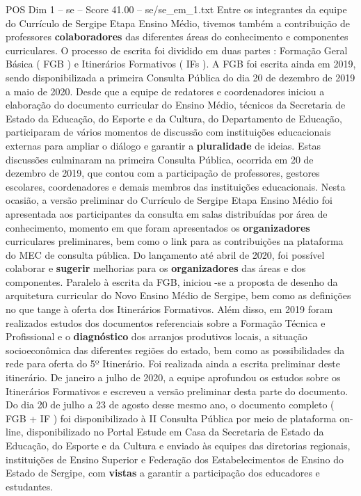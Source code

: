 \begin{textsample}{POS Dim 1 – se – Score 41.00 – se/se\_em\_1.txt}
Entre os integrantes da equipe do Currículo de Sergipe Etapa Ensino Médio, tivemos também a contribuição de professores \textbf{colaboradores} das diferentes áreas do conhecimento e componentes curriculares.
O processo de escrita foi dividido em duas partes : Formação Geral Básica ( FGB ) e Itinerários Formativos ( IFs ).
A FGB foi escrita ainda em 2019, sendo disponibilizada a primeira Consulta Pública do dia 20 de dezembro de 2019 a maio de 2020.
Desde que a equipe de redatores e coordenadores iniciou a elaboração do documento curricular do Ensino Médio, técnicos da Secretaria de Estado da Educação, do Esporte e da Cultura, do Departamento de Educação, participaram de vários momentos de discussão com instituições educacionais externas para ampliar o diálogo e garantir a \textbf{pluralidade} de ideias.
Estas discussões culminaram na primeira Consulta Pública, ocorrida em 20 de dezembro de 2019, que contou com a participação de professores, gestores escolares, coordenadores e demais membros das instituições educacionais.
Nesta ocasião, a versão preliminar do Currículo de Sergipe Etapa Ensino Médio foi apresentada aos participantes da consulta em salas distribuídas por área de conhecimento, momento em que foram apresentados os \textbf{organizadores} curriculares preliminares, bem como o link para as contribuições na plataforma do MEC de consulta pública.
Do lançamento até abril de 2020, foi possível colaborar e \textbf{sugerir} melhorias para os \textbf{organizadores} das áreas e dos componentes.
Paralelo à escrita da FGB, iniciou -se a proposta de desenho da arquitetura curricular do Novo Ensino Médio de Sergipe, bem como as definições no que tange à oferta dos Itinerários Formativos.
Além disso, em 2019 foram realizados estudos dos documentos referenciais sobre a Formação Técnica e Profissional e o \textbf{diagnóstico} dos arranjos produtivos locais, a situação socioeconômica das diferentes regiões do estado, bem como as possibilidades da rede para oferta do 5º Itinerário.
Foi realizada ainda a escrita preliminar deste itinerário.
De janeiro a julho de 2020, a equipe aprofundou os estudos sobre os Itinerários Formativos e escreveu a versão preliminar desta parte do documento.
Do dia 20 de julho a 23 de agosto desse mesmo ano, o documento completo ( FGB + IF ) foi disponibilizado à II Consulta Pública por meio de plataforma on-line, disponibilizado no Portal Estude em Casa da Secretaria de Estado da Educação, do Esporte e da Cultura e enviado às equipes das diretorias regionais, instituições de Ensino Superior e Federação dos Estabelecimentos de Ensino do Estado de Sergipe, com \textbf{vistas} a garantir a participação dos educadores e estudantes.

\end{textsample}
